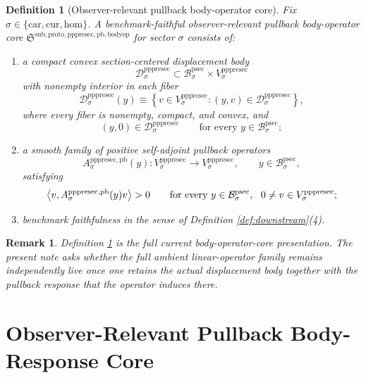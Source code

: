 \documentclass[11pt]{article}
\newcommand{\Car}{\mathrm{car}}
\newcommand{\Cur}{\mathrm{cur}}
\newcommand{\Hom}{\mathrm{hom}}
\newcommand{\ProtoSectionBody}[1]{\mathcal B_{#1}^{\mathrm{psec}}}
\newcommand{\PrePreProtoSectionVertical}[1]{V_{#1}^{\mathrm{pppresec}}}
\newcommand{\PrePreProtoSectionResidualBody}[1]{\mathcal D_{#1}^{\mathrm{pppresec}}}
\newcommand{\PrePreProtoSectionPullbackOperator}[1]{A_{#1}^{\mathrm{pppresec,pb}}}
\newcommand{\PullbackBodyOperatorCore}{\mathfrak S^{\mathrm{sub,proto,pppresec,pb,bodyop}}}
\newtheorem{definition}{Definition}
\newtheorem{remark}{Remark}
\begin{document}
\begin{definition}[Observer-relevant pullback body-operator core]
\label{def:bodyop}
Fix \(\sigma\in\{\Car,\Cur,\Hom\}\). A \emph{benchmark-faithful observer-relevant pullback body-operator core} \(\PullbackBodyOperatorCore\) for sector \(\sigma\) consists of:
\begin{enumerate}
    \item a compact convex section-centered displacement body
    \[
    \PrePreProtoSectionResidualBody{\sigma}
    \subset
    \ProtoSectionBody{\sigma}\times\PrePreProtoSectionVertical{\sigma}
    \]
    with nonempty interior in each fiber
    \[
    \PrePreProtoSectionResidualBody{\sigma}(y)
    \equiv
    \left\{
    v\in\PrePreProtoSectionVertical{\sigma}:(y,v)\in\PrePreProtoSectionResidualBody{\sigma}
    \right\},
    \]
    where every fiber is nonempty, compact, and convex, and
    \[
    (y,0)\in\PrePreProtoSectionResidualBody{\sigma}
    \qquad
    \text{for every }
    y\in\ProtoSectionBody{\sigma};
    \]
    \item a smooth family of positive self-adjoint pullback operators
    \[
    \PrePreProtoSectionPullbackOperator{\sigma}(y):
    \PrePreProtoSectionVertical{\sigma}\to\PrePreProtoSectionVertical{\sigma},
    \qquad
    y\in\ProtoSectionBody{\sigma},
    \]
    satisfying
    \[
    \ev{v,\PrePreProtoSectionPullbackOperator{\sigma}(y)v}>0
    \qquad
    \text{for every }
    y\in\ProtoSectionBody{\sigma},
    \ \ 0\neq v\in\PrePreProtoSectionVertical{\sigma};
    \]
    \item benchmark faithfulness in the sense of Definition \ref{def:downstream}(4).
\end{enumerate}
\end{definition}

\begin{remark}
Definition \ref{def:bodyop} is the full current body-operator-core presentation. The present note asks whether the full ambient linear-operator family remains independently live once one retains the actual displacement body together with the pullback response that the operator induces there.
\end{remark}

\section{Observer-Relevant Pullback Body-Response Core}
\end{document}

